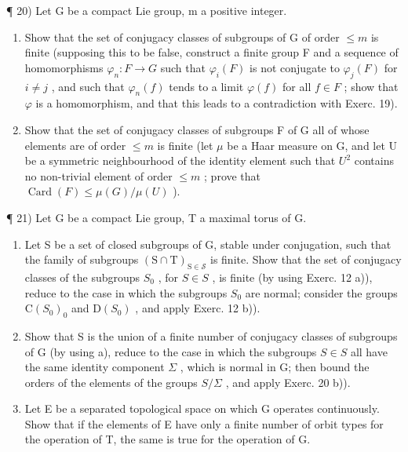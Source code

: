 ¶ 20) Let G be a compact Lie group, m a positive integer.

\begin{enumerate}
\def\labelenumi{\alph{enumi})}
\item
  Show that the set of conjugacy classes of subgroups of G of order \(\leq m\) is finite (supposing this to be false, construct a finite group F and a sequence of homomorphisms \(\varphi_{n}: F \to G\) such that \(\varphi_{i}(F)\) is not conjugate to \(\varphi_{j}(F)\) for \(i \neq j\) , and such that \(\varphi_{n}(f)\) tends to a limit \(\varphi(f)\) for all \(f \in F\) ; show that \(\varphi\) is a homomorphism, and that this leads to a contradiction with Exerc. 19).
\item
  Show that the set of conjugacy classes of subgroups F of G all of whose elements are of order \(\leq m\) is finite (let \(\mu\) be a Haar measure on G, and let U be a symmetric neighbourhood of the identity element such that \(U^{2}\) contains no non-trivial element of order \(\leq m\) ; prove that \(\operatorname{Card}(F) \leq \mu(G)/\mu(U)\) ).
\end{enumerate}

¶ 21) Let G be a compact Lie group, T a maximal torus of G.

\begin{enumerate}
\def\labelenumi{\alph{enumi})}
\item
  Let S be a set of closed subgroups of G, stable under conjugation, such that the family of subgroups \((\mathrm{S} \cap \mathrm{T})_{\mathrm{S} \in \mathcal{S}}\) is finite. Show that the set of conjugacy classes of the subgroups \(S_{0}\) , for \(S \in S\) , is finite (by using Exerc. 12 a)), reduce to the case in which the subgroups \(S_{0}\) are normal; consider the groups \(\mathrm{C}(S_{0})_{0}\) and \(\mathrm{D}(S_{0})\) , and apply Exerc. 12 b)).
\item
  Show that S is the union of a finite number of conjugacy classes of subgroups of G (by using a), reduce to the case in which the subgroups \(S \in S\) all have the same identity component \(\Sigma\) , which is normal in G; then bound the orders of the elements of the groups \(S/\Sigma\) , and apply Exerc. 20 b)).
\item
  Let E be a separated topological space on which G operates continuously. Show that if the elements of E have only a finite number of orbit types for the operation of T, the same is true for the operation of G.
\end{enumerate}

